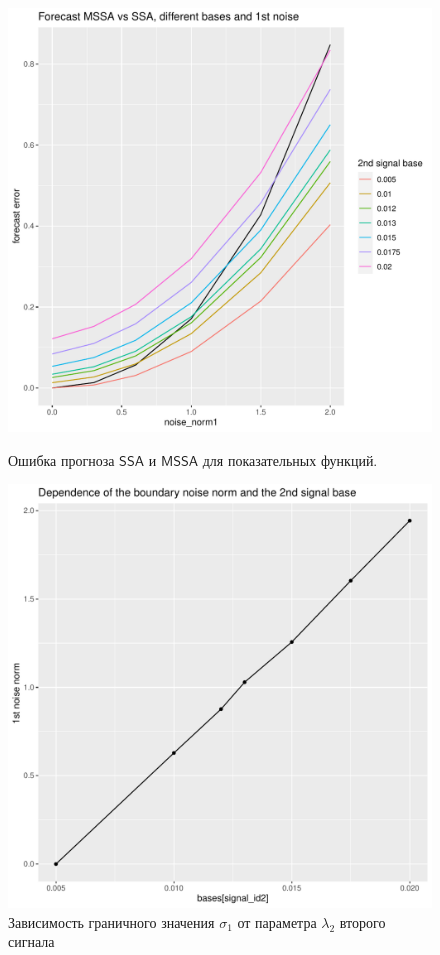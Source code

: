 \documentclass[specialist, substylefile = spbureport.rtx,
    subf,href,colorlinks=true, 12pt]{disser}
\newcommand{\SSA}{\mathsf{SSA}}
\newcommand{\MSSA}{\mathsf{MSSA}}
\begin{document}
        \begin{figure}[h]
            \centering
            \begin{minipage}{.45\textwidth}
                \centering
                \includegraphics[width=\textwidth]{experiment_2_exp1.pdf}
                \caption{Ошибка прогноза $\SSA$ и $\MSSA$ для показательных функций.}
                \label{fig:exp2_exp1}
            \end{minipage}\hfill
            \begin{minipage}{.45\textwidth}
                \centering
            \includegraphics[width=\textwidth]{experiment_2_exp2.pdf}
            \caption{Зависимость граничного значения $\sigma_1$ от параметра $\lambda_2$ второго сигнала}
            \label{fig:exp2_exp2}
            \end{minipage}
        \end{figure}
\end{document}
